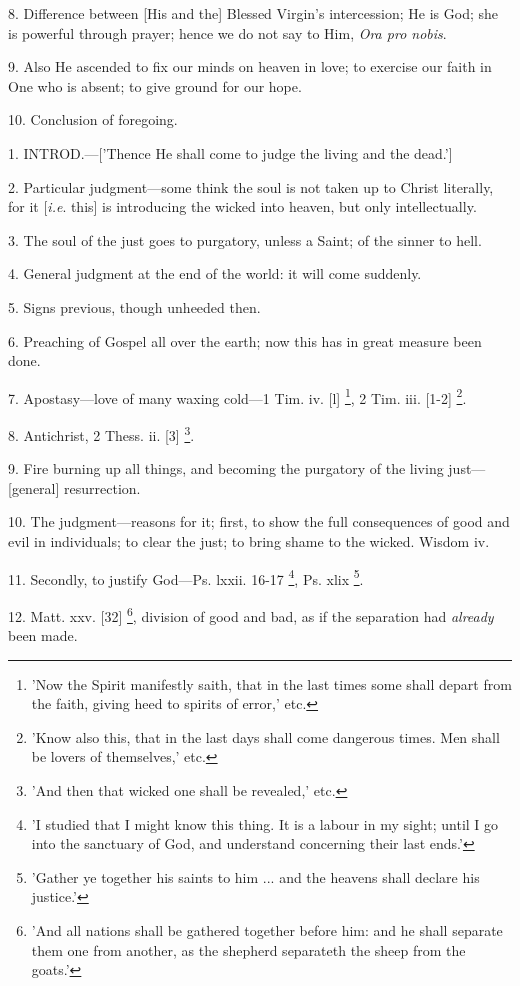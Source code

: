 8. Difference between [His and the] Blessed
Virgin's intercession; He is God; she is powerful through prayer;
hence we do not say to Him, \emph{Ora pro nobis}.

9. Also He ascended to fix our minds on heaven in
love; to exercise our faith in One who is absent; to give ground for
our hope.

10. Conclusion of foregoing.


1. INTROD.—['Thence
He shall come to judge the living and the dead.']

2. Particular judgment—some think the soul is
not taken up to Christ literally, for it [\emph{i.e}. this] is
introducing the wicked into heaven, but only intellectually.

3. The soul of the just goes to purgatory, unless
a Saint; of the sinner to hell.

4. General judgment at the end of the world: it
will come suddenly.

5. Signs previous, though unheeded then.

6. Preaching of Gospel all over the earth; now
this has in great measure been done.

7. Apostasy—love of many waxing cold—1 Tim.
iv. [l] \footnote{'Now the Spirit
manifestly saith, that in the last times some shall depart from the
faith, giving heed to spirits of error,' etc.}, 2 Tim. iii.
[1-2] \footnote{'Know also this, that in
the last days shall come dangerous times. Men shall be lovers of
themselves,' etc.}.

8. Antichrist, 2 Thess. ii. [3] \footnote{'And then that wicked
one shall be revealed,' etc.}.

9. Fire burning up all things, and becoming the
purgatory of the living just—[general] resurrection.

10. The judgment—reasons for it; first, to show
the full consequences of good and evil in individuals; to clear the
just; to bring shame to the wicked. Wisdom iv.

11. Secondly, to justify God—Ps. lxxii. 16-17 \footnote{'I studied that I might
know this thing. It is a labour in my sight; until I go into the
sanctuary of God, and understand concerning their last ends.'}, Ps. xlix \footnote{'Gather ye together his
saints to him ... and the heavens shall declare his justice.'}.

12. Matt. xxv. [32] \footnote{'And all nations shall
be gathered together before him: and he shall separate them one from
another, as the shepherd separateth the sheep from the goats.'}, division of good and bad, as if the separation had \emph{already}
been made.

